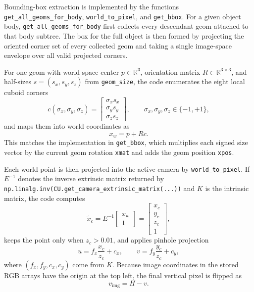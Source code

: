 \documentclass{article}
\begin{document}
Bounding-box extraction is implemented by the functions \texttt{get\_all\_geoms\_for\_body}, \texttt{world\_to\_pixel}, and \texttt{get\_bbox}. For a given object body, \texttt{get\_all\_geoms\_for\_body} first collects every descendant geom attached to that body subtree. The box for the full object is then formed by projecting the oriented corner set of every collected geom and taking a single image-space envelope over all valid projected corners.

For one geom with world-space center $p \in \mathbb{R}^3$, orientation matrix $R \in \mathbb{R}^{3 \times 3}$, and half-sizes $s=(s_x,s_y,s_z)$ from \texttt{geom\_size}, the code enumerates the eight local cuboid corners
\begin{equation}
c(\sigma_x,\sigma_y,\sigma_z) =
\begin{bmatrix}
\sigma_x s_x \\
\sigma_y s_y \\
\sigma_z s_z
\end{bmatrix},
\qquad \sigma_x,\sigma_y,\sigma_z \in \{-1,+1\},
\end{equation}
and maps them into world coordinates as
\begin{equation}
x_w = p + R c.
\end{equation}
This matches the implementation in \texttt{get\_bbox}, which multiplies each signed size vector by the current geom rotation \texttt{xmat} and adds the geom position \texttt{xpos}.

Each world point is then projected into the active camera by \texttt{world\_to\_pixel}. If $E^{-1}$ denotes the inverse extrinsic matrix returned by \texttt{np.linalg.inv(CU.get\_camera\_extrinsic\_matrix(...))} and $K$ is the intrinsic matrix, the code computes
\begin{equation}
\tilde{x}_c = E^{-1}
\begin{bmatrix}
x_w \\
1
\end{bmatrix}
=
\begin{bmatrix}
x_c \\
y_c \\
z_c \\
1
\end{bmatrix},
\end{equation}
keeps the point only when $z_c > 0.01$, and applies pinhole projection
\begin{equation}
u = f_x \frac{x_c}{z_c} + c_x,
\qquad
v = f_y \frac{y_c}{z_c} + c_y,
\end{equation}
where $(f_x,f_y,c_x,c_y)$ come from $K$. Because image coordinates in the stored RGB arrays have the origin at the top left, the final vertical pixel is flipped as
\begin{equation}
v_{\mathrm{img}} = H - v.
\end{equation}
\end{document}
